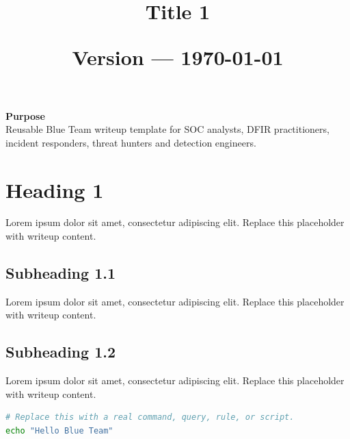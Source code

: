 \documentclass[11pt,a4paper]{article}
\title{
\vspace{-1cm}

\Huge
\textbf{\textcolor{primary}{Title 1}}\\

\vspace{0.2cm}

\textbf{\textcolor{white}{\doctitle}}

\vspace{0.8cm}

\Large
\textcolor{accent}{\docsubtitle}

\vspace{0.8cm}

\normalsize
\textcolor{muted}{\doctags}

\vspace{1.2cm}

\Large
\textcolor{text}{\docauthor}

\vspace{0.3cm}

\normalsize
\textcolor{muted}{Version \docversion{} --- \today}
}
\author{}
\date{}
\let\oldsection\section
\renewcommand{\section}{\clearpage\oldsection}
\newcommand{\placeholder}{\textcolor{muted}{Lorem ipsum dolor sit amet, consectetur adipiscing elit. Replace this placeholder with writeup content.}}
\begin{document}

\maketitle
\thispagestyle{empty}

\vfill

\begin{center}
\begin{tcolorbox}[
    colback=boxbg,
    colframe=primary,
    coltext=text,
    width=0.85\textwidth,
    arc=6pt,
    boxrule=1pt,
    left=12pt,
    right=12pt,
    top=12pt,
    bottom=12pt
]
\centering
\textbf{\textcolor{primary}{Purpose}}\\
Reusable Blue Team writeup template for SOC analysts, DFIR practitioners, incident responders, threat hunters and detection engineers.
\end{tcolorbox}
\end{center}

\clearpage

\tableofcontents
\thispagestyle{empty}

\clearpage

\setcounter{page}{1}


\section{Heading 1}

\begin{socbox}
\placeholder
\end{socbox}

\subsection{Subheading 1.1}

\placeholder

\subsection{Subheading 1.2}

\placeholder

\begin{lstlisting}[language=bash,caption={Command Example}]
# Replace this with a real command, query, rule, or script.
echo "Hello Blue Team"
\end{lstlisting}
\end{document}
